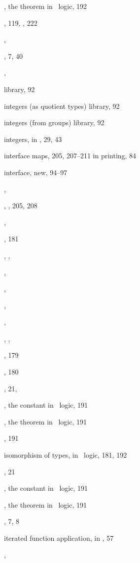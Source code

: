\begin{theindex}
  \item {}, the theorem in \HOL\ logic, 192
  \item {}, 119, , 222
  \item {}, 
  \item {}, 7, 40
  \item {}, 
  \item {} library, 92
  \item integers (as quotient types) library, 92
  \item integers (from groups) library, 92
  \item integers, in \ML, 29, 43
  \item interface maps, 205, 207--211
    \subitem in printing, 84
  \item interface, new, 94--97
  \item {}, 
  \item {}, , 205, 208
  \item {}, 
  \item {}, 181
  \item {}, , 
  \item {}, 
  \item {}, 
  \item {}, 
  \item {}, 
  \item {}, , 
  \item {}, 179
  \item {}, 180
  \item {}, 21, 
  \item {}, the constant in \HOL\ logic, 191
  \item {}, the theorem in \HOL\ logic, 191
  \item {}, 191
  \item isomorphism of types, in \HOL\ logic, 181, 192
  \item {}, 21
  \item {}, the constant in \HOL\ logic, 191
  \item {}, the theorem in \HOL\ logic, 191
  \item {}, 7, 8
  \item iterated function application, in \ML, 57
  \item {}, 


\end{theindex}
